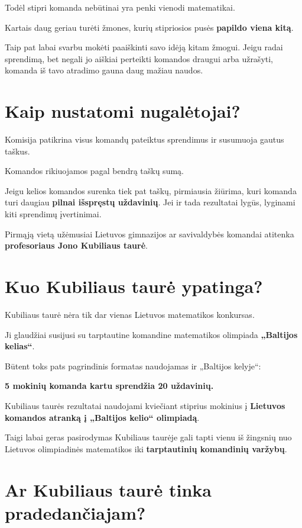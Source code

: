 \documentclass[11pt,a4paper]{article}
\begin{document}
Todėl stipri komanda nebūtinai yra penki vienodi matematikai.

Kartais daug geriau turėti žmones, kurių stipriosios pusės \textbf{papildo viena kitą}.

Taip pat labai svarbu mokėti paaiškinti savo idėją kitam žmogui. Jeigu radai sprendimą, bet negali jo aiškiai perteikti komandos draugui arba užrašyti, komanda iš tavo atradimo gauna daug mažiau naudos.

\section{Kaip nustatomi nugalėtojai?}

Komisija patikrina visus komandų pateiktus sprendimus ir susumuoja gautus taškus.

Komandos rikiuojamos pagal bendrą taškų sumą.

Jeigu kelios komandos surenka tiek pat taškų, pirmiausia žiūrima, kuri komanda turi daugiau \textbf{pilnai išspręstų uždavinių}. Jei ir tada rezultatai lygūs, lyginami kiti sprendimų įvertinimai.

Pirmąją vietą užėmusiai Lietuvos gimnazijos ar savivaldybės komandai atitenka \textbf{profesoriaus Jono Kubiliaus taurė}.

\section{Kuo Kubiliaus taurė ypatinga?}

Kubiliaus taurė nėra tik dar vienas Lietuvos matematikos konkursas.

Ji glaudžiai susijusi su tarptautine komandine matematikos olimpiada \textbf{„Baltijos kelias“}.

Būtent toks pats pagrindinis formatas naudojamas ir „Baltijos kelyje“:

\begin{infobox}
\centering
\textbf{5 mokinių komanda kartu sprendžia 20 uždavinių.}
\end{infobox}

Kubiliaus taurės rezultatai naudojami kviečiant stiprius mokinius į \textbf{Lietuvos komandos atranką į „Baltijos kelio“ olimpiadą}.

Taigi labai geras pasirodymas Kubiliaus taurėje gali tapti vienu iš žingsnių nuo Lietuvos olimpiadinės matematikos iki \textbf{tarptautinių komandinių varžybų}.

\section{Ar Kubiliaus taurė tinka pradedančiajam?}
\end{document}
